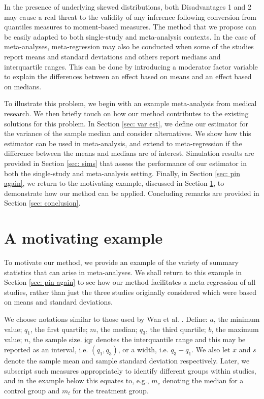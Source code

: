 \documentclass{article}
\begin{document}
In the presence of underlying skewed distributions, both Disadvantages 1 and 2 may cause a real threat to the validity of any inference following conversion from quantiles measures to moment-based measures.  The method that we propose can be easily adapted to both single-study and meta-analysis contexts.  In the case of meta-analyses, meta-regression may also be conducted when some of the studies report means and standard deviations and others report medians and interquartile ranges.  This can be done by introducing a moderator factor variable to explain the differences between an effect based on means and an effect based on medians.

To illustrate this problem, we begin with an example meta-analysis from medical research. We then briefly touch on how our method contributes to the existing solutions for this problem. In Section \ref{sec: var est}, we define our estimator for the variance of the sample median and consider alternatives. We show how this estimator can be used in meta-analysis, and extend to meta-regression if the difference between the means and medians are of interest. Simulation results are provided in Section \ref{sec: sims} that assess the performance of our estimator in both the single-study and meta-analysis setting.   Finally, in Section \ref{sec: pin again}, we return to the motivating example, discussed in Section \ref{sec: motiv}, to demonstrate how our method can be applied. Concluding remarks are provided in Section \ref{sec: conclusion}.

\section{A motivating example}
\label{sec: motiv}

To motivate our method, we provide an example of the variety of summary statistics that can arise in meta-analyses. We shall return to this example in Section \ref{sec: pin again} to see how our method facilitates a meta-regression of all studies, rather than just the three studies originally considered which were based on means and standard deviations.

We choose notations similar to those used by Wan et al. \cite{Wan2014}.  Define:
$a$, the minimum value;
$q_1$, the first quartile;
$m$, the median;
$q_3$, the third quartile;
$b$, the maximum value;
$n$, the sample size.  $\operatorname{iqr}$ denotes the interquantile range and this may be reported as an interval, i.e. $(q_1,q_3)$, or a width, i.e. $q_3-q_1$. We also let $\overline{x}$ and $s$ denote the sample mean and sample standard deviation respectively.  Later, we subscript such measures appropriately to identify different groups within studies, and in the example below this equates to, e.g., $m_c$ denoting the median for a control group and $m_t$ for the treatment group.
\end{document}
